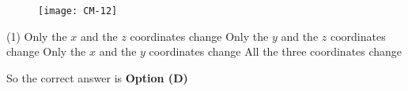 \begin{enumerate}
\begin{figure}[H]
\centering
\texttt{[image: CM-12]}
\end{figure}
\begin{tasks}(1)
\task[\textbf{A.}] Only the $x$ and the $z$ coordinates change
\task[\textbf{B.}] Only the $y$ and the $z$ coordinates change
\task[\textbf{C.}] Only the $x$ and the $y$ coordinates change
\task[\textbf{D.}] All the three coordinates change
\end{tasks}
\begin{answer}
So the correct answer is \textbf{Option (D)}
\end{answer}
	
	
	
\end{enumerate}